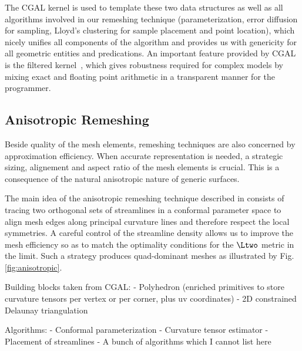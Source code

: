 The CGAL kernel is used to template these two data structures as well
as all algorithms involved in our remeshing technique
(parameterization, error diffusion for sampling, Lloyd's clustering
for sample placement and point location), which nicely unifies all
components of the algorithm and provides us with genericity for all
geometric entities and predications. An important feature provided by
CGAL is the filtered kernel~\cite{bbp-iayed-01,p-iaeia-99}, which
gives robustness required for complex models by mixing exact and
floating point arithmetic in a transparent manner for the programmer.

\subsection{Anisotropic Remeshing}


Beside quality of the mesh elements, remeshing techniques are also
concerned by approximation efficiency. When accurate representation is
needed, a strategic sizing, alignement and aspect ratio of the mesh
elements is crucial. This is a consequence of the natural anisotropic
nature of generic surfaces.


The main idea of the anisotropic remeshing technique described in
\cite{acdld-apr-03} consists of tracing two orthogonal sets of streamlines
in a conformal parameter space to align mesh edges along principal
curvature lines and therefore respect the local symmetries. A careful
control of the streamline density allows us to improve the mesh
efficiency so as to match the optimality conditions for the $\Ltwo$
metric in the limit. Such a strategy produces quad-dominant meshes as
illustrated by Fig.\ref{fig:anisotropic}.


Building blocks taken from CGAL:
- Polyhedron (enriched primitives to store curvature tensors per
vertex or per corner, plus uv coordinates)
- 2D constrained Delaunay triangulation

Algorithms:
- Conformal parameterization
- Curvature tensor estimator
- Placement of streamlines
- A bunch of algorithms which I cannot list here

